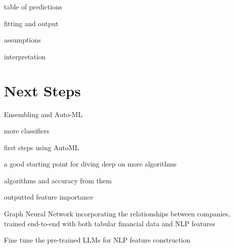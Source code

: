 \documentclass{article}
\begin{document}
    table of predictions

    fitting and output

    assumptions
    
    interpretation

    \section*{Next Steps}

    Ensembling and Auto-ML

    more classifiers
    
    first steps using AutoML

    a good starting point for diving deep on more algorithms

    algorithms and accuracy from them

    outputted feature importance

    Graph Neural Network incorporating the relationships between companies, trained end-to-end with both tabular financial data and NLP features
    

    Fine tune the pre-trained LLMs for NLP feature construction
    
    \clearpage
    \newpage

    
    



\end{document}
